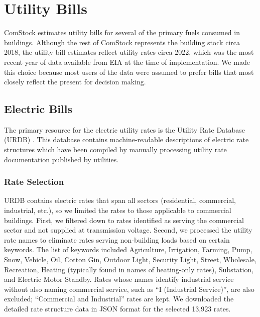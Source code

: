 \section{Utility Bills}
ComStock estimates utility bills for several of the primary fuels consumed in buildings.
Although the rest of ComStock represents the building stock circa 2018, the utility bill estimates reflect utility rates
circa 2022, which was the most recent year of data available from EIA at the time of implementation. We made this choice
because most users of the data were assumed to prefer bills that most closely reflect the present for decision making.

\subsection{Electric Bills}
The primary resource for the electric utility rates is the Utility Rate Database (URDB) \citep{urdb}. This database contains machine-readable descriptions of electric rate structures which have been compiled by manually processing utility rate documentation published by utilities.

\subsubsection{Rate Selection}
URDB contains electric rates that span all sectors (residential, commercial, industrial, etc.), so we limited the rates to those applicable to commercial buildings. First, we filtered down to rates identified as serving the commercial sector and not supplied at transmission voltage. Second, we processed the utility rate names to eliminate rates serving non-building loads based on certain keywords. The list of keywords included Agriculture, Irrigation, Farming, Pump, Snow, Vehicle, Oil, Cotton Gin, Outdoor Light, Security Light, Street, Wholesale, Recreation, Heating (typically found in names of heating-only rates), Substation, and Electric Motor Standby. Rates whose names identify industrial service without also naming commercial service, such as ``I (Industrial Service)'', are also excluded; ``Commercial and Industrial'' rates are kept. We downloaded the detailed rate structure data in JSON format for the selected 13,923 rates.


